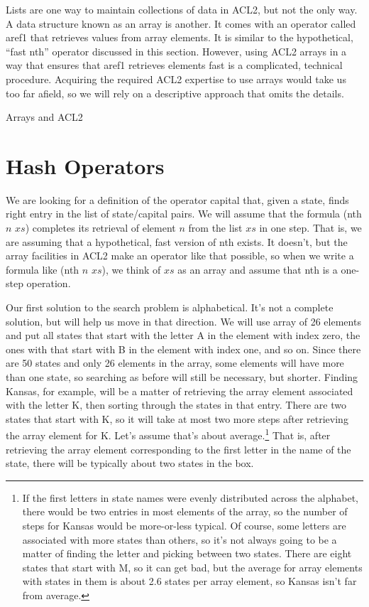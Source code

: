 \begin{aside}
Lists are one way to maintain collections of data in ACL2,
but not the only way. A data structure
known as an array is another. It comes with an operator
called \textsf{aref1} that retrieves values from array elements.
It is similar to the hypothetical, ``fast \textsf{nth}'' operator
discussed in this section. However, using ACL2 arrays in a way that
ensures that \textsf{aref1} retrieves elements fast
is a complicated, technical procedure.
Acquiring the required ACL2 expertise to use arrays
would take us too far afield, so we will rely on a
descriptive approach that omits the details.
\caption{Arrays and ACL2}
\end{aside}

\section{Hash Operators}

We are looking for a definition of the operator
\textsf{capital} that, given a state, finds right entry
in the list of state/capital pairs.
We will assume that the formula \textsf{(nth} $n$ $xs$\textsf{)}
completes its retrieval of element $n$ from the list $xs$
in one step. That is, we are assuming that a hypothetical,
fast version of \textsf{nth} exists. It doesn't, but the
array facilities in ACL2 make an operator like that possible,
so when we write a formula like
\textsf{(nth} $n$ $xs$\textsf{)},
we think of $xs$ as an array and assume that
\textsf{nth} is a one-step operation.

Our first solution to the search problem is alphabetical.
It's not a complete solution, but will help us move in that direction.
We will use array of 26 elements
and put all states that start with the letter A in
the element with index zero,
the ones with that start with B in the element with index one, and so on.
Since there are 50 states and only
26 elements in the array, some elements will have more than one state,
so searching as before will still be necessary, but shorter.
Finding Kansas, for example, will be
a matter of retrieving the array element associated with
the letter K, then sorting through the states in that entry.
There are two states that start with K,
so it will take at most two more steps after retrieving
the array element for K.  Let's assume that's about
average.\footnote{If the first letters in state names
were evenly distributed across the alphabet, there would be
two entries in most elements of the array, so the number of steps
for Kansas would be more-or-less typical.
Of course, some letters are associated with more states than
others, so it's not always going to be a matter of finding
the letter and picking between two states. There are eight
states that start with M, so it can get bad,
but the average for array elements with states in them
is about 2.6 states per array element, so
Kansas isn't far from average.}
That is, after retrieving the array element corresponding to
the first letter in the name of the state, there will
be typically about two states in the box.

